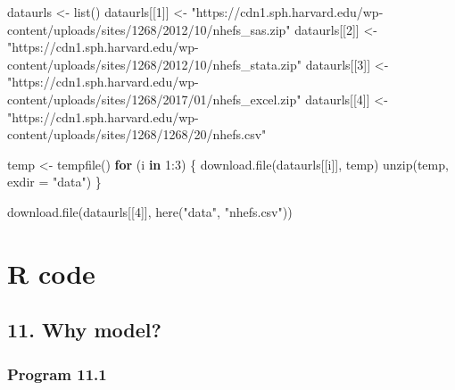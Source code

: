 \documentclass[
  10pt,
]{book}
\newenvironment{Shaded}{\begin{snugshade}}{\end{snugshade}}
\newcommand{\AttributeTok}[1]{\textcolor[rgb]{0.77,0.63,0.00}{#1}}
\newcommand{\ControlFlowTok}[1]{\textcolor[rgb]{0.13,0.29,0.53}{\textbf{#1}}}
\newcommand{\DecValTok}[1]{\textcolor[rgb]{0.00,0.00,0.81}{#1}}
\newcommand{\FunctionTok}[1]{\textcolor[rgb]{0.00,0.00,0.00}{#1}}
\newcommand{\NormalTok}[1]{#1}
\newcommand{\OtherTok}[1]{\textcolor[rgb]{0.56,0.35,0.01}{#1}}
\newcommand{\SpecialCharTok}[1]{\textcolor[rgb]{0.00,0.00,0.00}{#1}}
\newcommand{\StringTok}[1]{\textcolor[rgb]{0.31,0.60,0.02}{#1}}
\begin{document}
\begin{Shaded}
\begin{Highlighting}[]
\NormalTok{dataurls }\OtherTok{\textless{}{-}} \FunctionTok{list}\NormalTok{()}
\NormalTok{dataurls[[}\DecValTok{1}\NormalTok{]] }\OtherTok{\textless{}{-}} \StringTok{"https://cdn1.sph.harvard.edu/wp{-}content/uploads/sites/1268/2012/10/nhefs\_sas.zip"}
\NormalTok{dataurls[[}\DecValTok{2}\NormalTok{]] }\OtherTok{\textless{}{-}} \StringTok{"https://cdn1.sph.harvard.edu/wp{-}content/uploads/sites/1268/2012/10/nhefs\_stata.zip"}
\NormalTok{dataurls[[}\DecValTok{3}\NormalTok{]] }\OtherTok{\textless{}{-}} \StringTok{"https://cdn1.sph.harvard.edu/wp{-}content/uploads/sites/1268/2017/01/nhefs\_excel.zip"}
\NormalTok{dataurls[[}\DecValTok{4}\NormalTok{]] }\OtherTok{\textless{}{-}} \StringTok{"https://cdn1.sph.harvard.edu/wp{-}content/uploads/sites/1268/1268/20/nhefs.csv"}

\NormalTok{temp }\OtherTok{\textless{}{-}} \FunctionTok{tempfile}\NormalTok{()}
\ControlFlowTok{for}\NormalTok{ (i }\ControlFlowTok{in} \DecValTok{1}\SpecialCharTok{:}\DecValTok{3}\NormalTok{) \{}
    \FunctionTok{download.file}\NormalTok{(dataurls[[i]], temp)}
    \FunctionTok{unzip}\NormalTok{(temp, }\AttributeTok{exdir =} \StringTok{"data"}\NormalTok{)}
\NormalTok{\}}

\FunctionTok{download.file}\NormalTok{(dataurls[[}\DecValTok{4}\NormalTok{]], }\FunctionTok{here}\NormalTok{(}\StringTok{"data"}\NormalTok{, }\StringTok{"nhefs.csv"}\NormalTok{))}
\end{Highlighting}
\end{Shaded}

\mainmatter

\hypertarget{part-r-code}{%
\part*{R code}\label{part-r-code}}

\hypertarget{why-model}{%
\chapter*{11. Why model?}\label{why-model}}

\hypertarget{program-11.1}{%
\section{Program 11.1}\label{program-11.1}}
\end{document}
